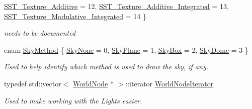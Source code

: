 \begin{DoxyCompactItemize}
\hyperlink{classphys_1_1SceneManager_a427f1bbb52c11ad07352ae01d8b3c746af9aba631cfa4181d30d83fa8c2bd71de}{SST\_\-Texture\_\-Additive} =  12, 
\hyperlink{classphys_1_1SceneManager_a427f1bbb52c11ad07352ae01d8b3c746a2cb2c18049fd6f062db3a25e45aa9a16}{SST\_\-Texture\_\-Additive\_\-Integrated} =  13, 
\hyperlink{classphys_1_1SceneManager_a427f1bbb52c11ad07352ae01d8b3c746a85419a12cb66f84865d9c0e50503af8c}{SST\_\-Texture\_\-Modulative\_\-Integrated} =  14
 \}
\begin{DoxyCompactList}\small\item\em needs to be documented \item\end{DoxyCompactList}\item 
enum \hyperlink{classphys_1_1SceneManager_a91dd086aabaab926d070c65fc14828d6}{SkyMethod} \{ \hyperlink{classphys_1_1SceneManager_a91dd086aabaab926d070c65fc14828d6a11aa0789aa0b39732c6968587b56e026}{SkyNone} =  0, 
\hyperlink{classphys_1_1SceneManager_a91dd086aabaab926d070c65fc14828d6af1251fd4f24ec8061fb585474635c10f}{SkyPlane} =  1, 
\hyperlink{classphys_1_1SceneManager_a91dd086aabaab926d070c65fc14828d6ac2ecb3ad06b3b545c27b7d70ca1b3a5a}{SkyBox} =  2, 
\hyperlink{classphys_1_1SceneManager_a91dd086aabaab926d070c65fc14828d6aa3c39672f84de2ae8ffb883e04af2edd}{SkyDome} =  3
 \}
\begin{DoxyCompactList}\small\item\em Used to help identify which method is used to draw the sky, if any. \item\end{DoxyCompactList}\item 
\hypertarget{classphys_1_1SceneManager_a67b62f6e9116423306b82e20cb2415fd}{
typedef std::vector$<$ \hyperlink{classphys_1_1WorldNode}{WorldNode} $\ast$ $>$::iterator \hyperlink{classphys_1_1SceneManager_a67b62f6e9116423306b82e20cb2415fd}{WorldNodeIterator}}
\label{classphys_1_1SceneManager_a67b62f6e9116423306b82e20cb2415fd}

\begin{DoxyCompactList}\small\item\em Used to make working with the Lights easier. \item\end{DoxyCompactList}\end{DoxyCompactItemize}
